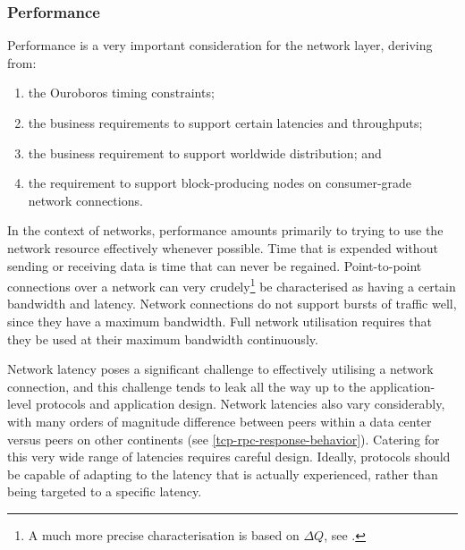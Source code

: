 \documentclass[11pt,a4paper]{article}
\begin{document}
\subsubsection{Performance}
\label{performance}

Performance is a very important consideration for the network layer,
deriving from:

\begin{enumerate}
\item
  the Ouroboros timing constraints;
\item
  the business requirements to support certain latencies and
  throughputs;
\item
  the business requirement to support worldwide distribution; and
\item
  the requirement to support block-producing nodes on consumer-grade
  network connections.
\end{enumerate}

In the context of networks, performance amounts primarily to trying to
use the network resource effectively whenever possible. Time that is
expended without sending or receiving data is time that can never be
regained. Point-to-point connections over a network can very
crudely\footnote{A much more precise characterisation is based on $\Delta{}Q$,
  see \cite{Comp20}.} be characterised as having a certain bandwidth and
latency. Network connections do not support bursts of traffic well,
since they have a maximum bandwidth. Full network utilisation requires
that they be used at their maximum bandwidth continuously.

Network latency poses a significant challenge to effectively utilising a
network connection, and this challenge tends to leak all the way up to
the application-level protocols and application design. Network
latencies also vary considerably, with many orders of magnitude
difference between peers within a data center versus peers on other
continents (see \cref{tcp-rpc-response-behavior}). Catering for this very wide range of latencies requires
careful design. Ideally, protocols should be capable of adapting to the
latency that is actually experienced, rather than being targeted to a
specific latency.
\end{document}
